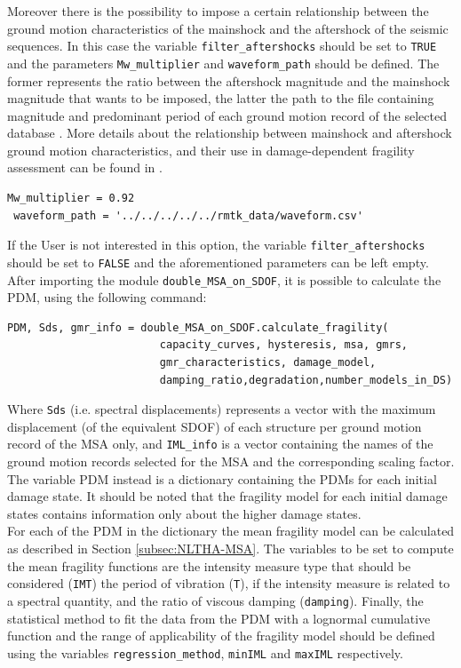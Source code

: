 {Moreover there is the possibility to impose a certain relationship between the ground motion characteristics of the mainshock and the aftershock of the seismic sequences. In this case the variable \verb=filter_aftershocks= should be set to \verb=TRUE= and the parameters \verb=Mw_multiplier= and \verb=waveform_path= should be defined. The former represents the ratio between the aftershock magnitude and the mainshock magnitude that wants to be imposed, the latter the path to the file containing magnitude and predominant period of each ground motion record of the selected database . More details about the relationship between mainshock and aftershock ground motion characteristics, and their use in damage-dependent fragility assessment can be found in \citep{Casotto2016}.

\begin{Verbatim}[frame=single, commandchars=\\\{\}, samepage=true]
 Mw_multiplier = 0.92
 waveform_path = '../../../../../rmtk_data/waveform.csv'
\end{Verbatim}

If the User is not interested in this option, the variable \verb=filter_aftershocks= should be set to \verb=FALSE= and the aforementioned parameters can be left empty.\\
After importing the module \verb=double_MSA_on_SDOF=, it is possible to calculate the PDM, using the following command:

\begin{Verbatim}[frame=single, commandchars=\\\{\}, samepage=true]
PDM, Sds, gmr_info = double_MSA_on_SDOF.calculate_fragility(
                        capacity_curves, hysteresis, msa, gmrs, 
                        gmr_characteristics, damage_model, 
                        damping_ratio,degradation,number_models_in_DS)
\end{Verbatim}

Where \verb=Sds= (i.e. spectral displacements) represents a vector with the maximum displacement (of the equivalent SDOF) of each structure per ground motion record of the MSA only, and \verb=IML_info= is a vector containing the names of the ground motion records selected for the MSA and the corresponding scaling factor. The variable PDM instead is a dictionary containing the PDMs for each initial damage state. It should be noted that the fragility model for each initial damage states contains information only about the higher damage states.\\ 
For each of the PDM in the dictionary the mean fragility model can be calculated as described in Section \ref{subsec:NLTHA-MSA}. The variables to be set to compute the mean fragility functions are the intensity measure type that should be considered (\verb=IMT=) the period of vibration (\verb=T=), if the intensity measure is related to a spectral quantity, and the ratio of viscous damping (\verb=damping=). Finally, the statistical method to fit the data from the PDM with a lognormal cumulative function and the range of applicability of the fragility model should be defined using the variables \verb=regression_method=, \verb=minIML= and \verb=maxIML= respectively.\

}
